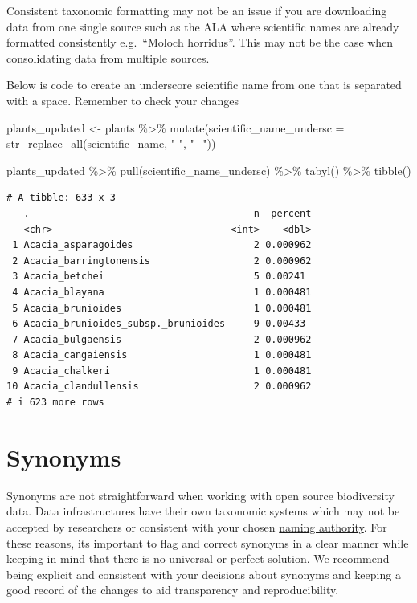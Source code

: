 \documentclass[
  letterpaper,
  DIV=11,
  numbers=noendperiod,
  oneside]{scrreprt}
\newenvironment{Shaded}{\begin{snugshade}}{\end{snugshade}}
\newcommand{\AttributeTok}[1]{\textcolor[rgb]{0.40,0.45,0.13}{#1}}
\newcommand{\FunctionTok}[1]{\textcolor[rgb]{0.28,0.35,0.67}{#1}}
\newcommand{\NormalTok}[1]{\textcolor[rgb]{0.00,0.23,0.31}{#1}}
\newcommand{\OtherTok}[1]{\textcolor[rgb]{0.00,0.23,0.31}{#1}}
\newcommand{\SpecialCharTok}[1]{\textcolor[rgb]{0.37,0.37,0.37}{#1}}
\newcommand{\StringTok}[1]{\textcolor[rgb]{0.13,0.47,0.30}{#1}}
\begin{document}
Consistent taxonomic formatting may not be an issue if you are
downloading data from one single source such as the ALA where scientific
names are already formatted consistently e.g.~``Moloch horridus''. This
may not be the case when consolidating data from multiple sources.

Below is code to create an underscore scientific name from one that is
separated with a space. Remember to check your changes

\begin{Shaded}
\begin{Highlighting}[]
\NormalTok{plants\_updated }\OtherTok{\textless{}{-}}\NormalTok{ plants }\SpecialCharTok{\%\textgreater{}\%} 
  \FunctionTok{mutate}\NormalTok{(}\AttributeTok{scientific\_name\_undersc =} \FunctionTok{str\_replace\_all}\NormalTok{(scientific\_name, }\StringTok{" "}\NormalTok{, }\StringTok{"\_"}\NormalTok{)) }

\NormalTok{plants\_updated }\SpecialCharTok{\%\textgreater{}\%} 
  \FunctionTok{pull}\NormalTok{(scientific\_name\_undersc) }\SpecialCharTok{\%\textgreater{}\%} 
  \FunctionTok{tabyl}\NormalTok{() }\SpecialCharTok{\%\textgreater{}\%} 
  \FunctionTok{tibble}\NormalTok{()}
\end{Highlighting}
\end{Shaded}

\begin{verbatim}
# A tibble: 633 x 3
   .                                       n  percent
   <chr>                               <int>    <dbl>
 1 Acacia_asparagoides                     2 0.000962
 2 Acacia_barringtonensis                  2 0.000962
 3 Acacia_betchei                          5 0.00241 
 4 Acacia_blayana                          1 0.000481
 5 Acacia_brunioides                       1 0.000481
 6 Acacia_brunioides_subsp._brunioides     9 0.00433 
 7 Acacia_bulgaensis                       2 0.000962
 8 Acacia_cangaiensis                      1 0.000481
 9 Acacia_chalkeri                         1 0.000481
10 Acacia_clandullensis                    2 0.000962
# i 623 more rows
\end{verbatim}

\hypertarget{synonyms}{%
\section{Synonyms}\label{synonyms}}

Synonyms are not straightforward when working with open source
biodiversity data. Data infrastructures have their own taxonomic systems
which may not be accepted by researchers or consistent with your chosen
\href{link_back}{naming authority}. For these reasons, its important to
flag and correct synonyms in a clear manner while keeping in mind that
there is no universal or perfect solution. We recommend being explicit
and consistent with your decisions about synonyms and keeping a good
record of the changes to aid transparency and reproducibility.
\end{document}
